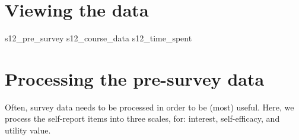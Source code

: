 \documentclass[]{book}
\newenvironment{Shaded}{\begin{snugshade}}{\end{snugshade}}
\newcommand{\NormalTok}[1]{#1}
\begin{document}
\section{Viewing the data}\label{viewing-the-data}

\begin{Shaded}
\begin{Highlighting}[]
\NormalTok{s12_pre_survey }
\NormalTok{s12_course_data}
\NormalTok{s12_time_spent}
\end{Highlighting}
\end{Shaded}

\section{Processing the pre-survey
data}\label{processing-the-pre-survey-data}

Often, survey data needs to be processed in order to be (most) useful.
Here, we process the self-report items into three scales, for: interest,
self-efficacy, and utility value.
\end{document}
